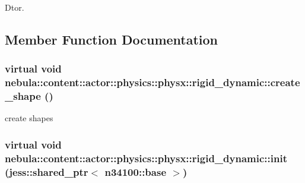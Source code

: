 Dtor. 

\subsection{Member Function Documentation}
\hypertarget{classnebula_1_1content_1_1actor_1_1physics_1_1physx_1_1rigid__dynamic_a0c7836a5a0fb5a6e1bdb50ec4e250d27}{
\subsubsection[{create\_\-shape}]{\setlength{\rightskip}{0pt plus 5cm}virtual void nebula::content::actor::physics::physx::rigid\_\-dynamic::create\_\-shape ()}}
\label{classnebula_1_1content_1_1actor_1_1physics_1_1physx_1_1rigid__dynamic_a0c7836a5a0fb5a6e1bdb50ec4e250d27}


create shapes \hypertarget{classnebula_1_1content_1_1actor_1_1physics_1_1physx_1_1rigid__dynamic_af8da44c366586118db1c6c98cb0e651f}{
\subsubsection[{init}]{\setlength{\rightskip}{0pt plus 5cm}virtual void nebula::content::actor::physics::physx::rigid\_\-dynamic::init (jess::shared\_\-ptr$<$ {\bf n34100::base} $>$)}}
\label{classnebula_1_1content_1_1actor_1_1physics_1_1physx_1_1rigid__dynamic_af8da44c366586118db1c6c98cb0e651f}


